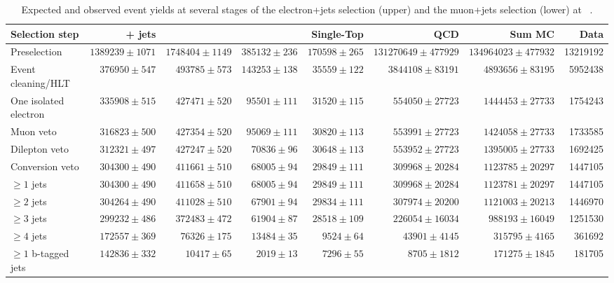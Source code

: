 \begin{table}
  \centering
   \caption{Expected and observed event yields at several stages of the electron+jets selection (upper) and
   the muon+jets selection (lower) at ~\TeV.}
    \label{tab:cut_flow_8TeV}
    \resizebox{\columnwidth}{!} {
    \begin{tabular}{lrrrrrrr}
    \hline
    \hline
	Selection step & \ttbar + jets & \WpJets & \ZpJets & Single-Top & QCD & Sum MC & Data \\
	\hline
	Preselection  &  $1389239 \pm 1071$ &  $1748404 \pm 1149$ &  $385132 \pm 236$ &  $170598 \pm 265$ &  $131270649 \pm 477929$ &  $134964023 \pm 477932$ &  13219192 \\ 
	Event cleaning/HLT  &  $376950 \pm 547$ &  $493785 \pm 573$ &  $143253 \pm 138$ &  $35559 \pm 122$ &  $3844108 \pm 83191$ &  $4893656 \pm 83195$ &  5952438 \\ 
	One isolated electron  &  $335908 \pm 515$ &  $427471 \pm 520$ &  $95501 \pm 111$ &  $31520 \pm 115$ &  $554050 \pm 27723$ &  $1444453 \pm 27733$ &  1754243 \\ 
	Muon veto  &  $316823 \pm 500$ &  $427354 \pm 520$ &  $95069 \pm 111$ &  $30820 \pm 113$ &  $553991 \pm 27723$ &  $1424058 \pm 27733$ &  1733585 \\ 
	Dilepton veto  &  $312321 \pm 497$ &  $427247 \pm 520$ &  $70836 \pm 96$ &  $30648 \pm 113$ &  $553952 \pm 27723$ &  $1395005 \pm 27733$ &  1692425 \\ 
	Conversion veto  &  $304300 \pm 490$ &  $411661 \pm 510$ &  $68005 \pm 94$ &  $29849 \pm 111$ &  $309968 \pm 20284$ &  $1123785 \pm 20297$ &  1447105 \\ 
	$\geq 1$ jets  &  $304300 \pm 490$ &  $411658 \pm 510$ &  $68005 \pm 94$ &  $29849 \pm 111$ &  $309968 \pm 20284$ &  $1123781 \pm 20297$ &  1447105 \\ 
	$\geq 2$ jets  &  $304264 \pm 490$ &  $411028 \pm 510$ &  $67901 \pm 94$ &  $29834 \pm 111$ &  $307974 \pm 20200$ &  $1121003 \pm 20213$ &  1446970 \\ 
	$\geq 3$ jets  &  $299232 \pm 486$ &  $372483 \pm 472$ &  $61904 \pm 87$ &  $28518 \pm 109$ &  $226054 \pm 16034$ &  $988193 \pm 16049$ &  1251530 \\ 
	$\geq 4$ jets  &  $172557 \pm 369$ &  $76326 \pm 175$ &  $13484 \pm 35$ &  $9524 \pm 64$ &  $43901 \pm 4145$ &  $315795 \pm 4165$ &  361692 \\ 
	$\geq 1$ b-tagged jets  &  $142836 \pm 332$ &  $10417 \pm 65$ &  $2019 \pm 13$ &  $7296 \pm 55$ &  $8705 \pm 1812$ &  $171275 \pm 1845$ &  181705 \\ 

\end{tabular}}
\end{table}
